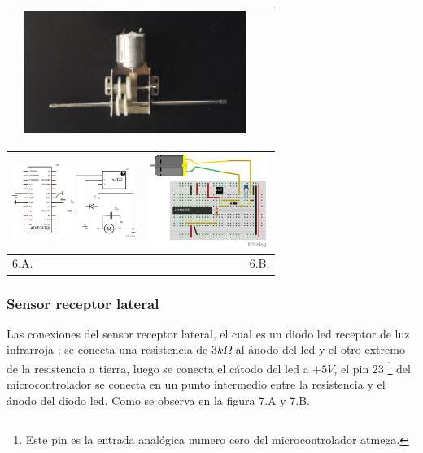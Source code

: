 \documentclass[12]{article}
\newenvironment{Figure}
{\par\medskip\noindent\minipage{\linewidth}}
{\endminipage\par\medskip}
\begin{document}
\begin{multicols}{2}
\begin{Figure}
\center
\begin{tabular}{|l|r|}
\hline
\includegraphics[width=8cm, height=4cm]{img/transmision.png}  \\ \hline
\end{tabular}
\label{fig:g5}
\end{Figure}

\begin{Figure}
\center
\begin{tabular}{|l|r|}
\hline
\includegraphics[width=4cm, height=3cm]{img/esquemamotor.png} & \includegraphics[width=4cm, height=3cm]{img/montajemot.png} \\ \hline
6.A. & 6.B. \\ \hline
\end{tabular}
\label{fig:g6}
\end{Figure}

\subsubsection{Sensor receptor lateral}
Las conexiones del sensor receptor lateral, el cual es un diodo led receptor de luz infrarroja \cite{INFRARED}; se conecta una resistencia de $3 k\Omega$ al ánodo del led y el otro extremo de la resistencia a tierra, luego se conecta el cátodo del led a $+5V$, el pin 23 \footnote{Este pin es la entrada analógica numero cero del microcontrolador atmega.} del microcontrolador se conecta  en un punto intermedio entre la resistencia y el ánodo del diodo led. Como se observa en la figura 7.A y 7.B.


\end{multicols}
\end{document}
